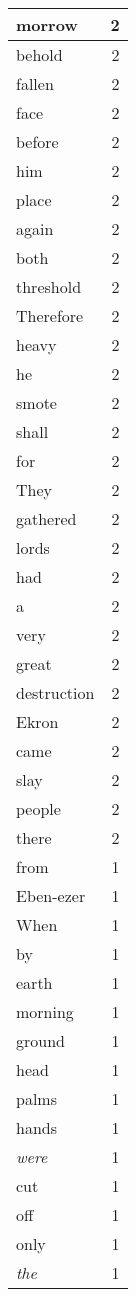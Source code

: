 \begin{center}
\begin{longtable}{l|r}
morrow & 2 \\ \hline
behold & 2 \\ \hline
fallen & 2 \\ \hline
face & 2 \\ \hline
before & 2 \\ \hline
him & 2 \\ \hline
place & 2 \\ \hline
again & 2 \\ \hline
both & 2 \\ \hline
threshold & 2 \\ \hline
Therefore & 2 \\ \hline
heavy & 2 \\ \hline
he & 2 \\ \hline
smote & 2 \\ \hline
shall & 2 \\ \hline
for & 2 \\ \hline
They & 2 \\ \hline
gathered & 2 \\ \hline
lords & 2 \\ \hline
had & 2 \\ \hline
a & 2 \\ \hline
very & 2 \\ \hline
great & 2 \\ \hline
destruction & 2 \\ \hline
Ekron & 2 \\ \hline
came & 2 \\ \hline
slay & 2 \\ \hline
people & 2 \\ \hline
there & 2 \\ \hline
from & 1 \\ \hline
Eben-ezer & 1 \\ \hline
When & 1 \\ \hline
by & 1 \\ \hline
earth & 1 \\ \hline
morning & 1 \\ \hline
ground & 1 \\ \hline
head & 1 \\ \hline
palms & 1 \\ \hline
hands & 1 \\ \hline
\emph{were} & 1 \\ \hline
cut & 1 \\ \hline
off & 1 \\ \hline
only & 1 \\ \hline
\emph{the} & 1 \\ \hline

\end{longtable}
\end{center}
